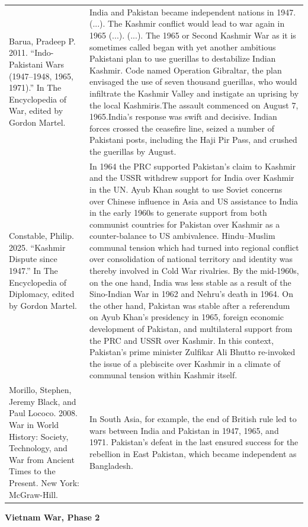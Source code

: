 {\begin{longtable}{p{}p{}}
\\
Barua, Pradeep P. 2011. “Indo-Pakistani Wars (1947–1948, 1965, 1971).” In The Encyclopedia of War, edited by Gordon Martel. & India and Pakistan became independent nations in 1947. (...). The Kashmir conflict would lead to war again in 1965 (...). (...). 
The 1965 or Second Kashmir War as it is sometimes called began with yet another ambitious Pakistani plan to use guerillas to destabilize Indian Kashmir. Code named Operation Gibraltar, the plan envisaged the use of seven thousand guerillas, who would infiltrate the Kashmir Valley and instigate an uprising by the local Kashmiris.The assault commenced on August 7, 1965.India's response was swift and decisive. Indian forces crossed the ceasefire line, seized a number of Pakistani posts, including the Haji Pir Pass, and crushed the guerillas by August.
\\
Constable, Philip. 2025. “Kashmir Dispute since 1947.” In The Encyclopedia of Diplomacy, edited by Gordon Martel. & In 1964 the PRC supported Pakistan's claim to Kashmir and the USSR withdrew support for India over Kashmir in the UN. Ayub Khan sought to use Soviet concerns over Chinese influence in Asia and US assistance to India in the early 1960s to generate support from both communist countries for Pakistan over Kashmir as a counter-balance to US ambivalence. Hindu–Muslim communal tension which had turned into regional conflict over consolidation of national territory and identity was thereby involved in Cold War rivalries. By the mid-1960s, on the one hand, India was less stable as a result of the Sino-Indian War in 1962 and Nehru's death in 1964. On the other hand, Pakistan was stable after a referendum on Ayub Khan's presidency in 1965, foreign economic development of Pakistan, and multilateral support from the PRC and USSR over Kashmir. In this context, Pakistan's prime minister Zulfikar Ali Bhutto re-invoked the issue of a plebiscite over Kashmir in a climate of communal tension within Kashmir itself.
\\
Morillo, Stephen, Jeremy Black, and Paul Lococo. 2008. War in World History: Society, Technology, and War from Ancient Times to the Present. New York: McGraw-Hill. & In South Asia, for example, the end of British rule led to wars between India and Pakistan in 1947, 1965, and 1971. Pakistan's defeat in the last ensured success for the rebellion in East Pakistan, which became independent as Bangladesh.
\\
\end{longtable}}
\clearpage
         \textbf{Vietnam War, Phase 2} 


